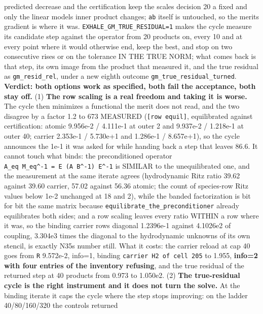 \documentclass[english,a4paper]{my_memo}
\begin{document}
\begin{itemize}
  predicted decrease and the certification keep the scales decision 20 a
  fixed and only the linear model\textquotesingle s inner product changes; \texttt{ab} itself is
  untouched, so the merit\textquotesingle s gradient is where it was.
  \texttt{EXHALE\_GM\_TRUE\_RESIDUAL=1} makes the cycle measure its candidate step
  against the operator from 20 products on, every 10 and at every point
  where it would otherwise end, keep the best, and stop on two consecutive
  rises or on the tolerance IN THE TRUE NORM; what comes back is that
  step, its own image from the product that measured it, and the true
  residual as \texttt{gm\_resid\_rel}, under a new eighth outcome
  \texttt{gm\_true\_residual\_turned}. \textbf{Verdict: both options work as specified, both
  fail the acceptance, both stay off.} (1) \textbf{The row scaling is a real
  freedom and taking it is worse.} The cycle then minimizes a functional
  the merit does not read, and the two disagree by a factor 1.2 to 673
  MEASURED (\texttt{{[}row\ equil{]}}, equilibrated against certification: atomic
  9.956e-2 / 4.111e-1 at outer 2 and 9.937e-2 / 1.218e-1 at outer 40;
  carrier 2.353e-1 / 5.730e+1 and 1.286e-1 / 8.657e+1), so the cycle
  announces the 1e-1 it was asked for while handing back a step that
  leaves 86.6. It cannot touch what binds: the preconditioned operator
  \texttt{A\_eq\ M\_eq\^{}-1\ =\ E\ (A\ B\^{}-1)\ E\^{}-1} is SIMILAR to the unequilibrated one,
  and the measurement at the same iterate agrees (hydrodynamic Ritz ratio
  39.62 against 39.60 carrier, 57.02 against 56.36 atomic; the count of
  species-row Ritz values below 1e-2 unchanged at 18 and 2), while the
  banded factorization is bit for bit the same matrix because
  \texttt{equilibrate\_the\_preconditioner} already equilibrates both sides; and a
  row scaling leaves every ratio WITHIN a row where it was, so the binding
  carrier row\textquotesingle s diagonal 1.2396e-1 against 4.1026e2 of coupling, 3.304e3
  times the diagonal to the hydrodynamic unknowns of its own stencil, is
  exactly N35\textquotesingle s number still. What it costs: the carrier reload at cap 40
  goes from \texttt{\textbar{}\textbar{}R\textbar{}\textbar{}} 9.572e-2, info=1, binding \texttt{carrier\ H2\ of\ cell\ 205} to
  1.955, \textbf{info=2 with four entries of the inventory refusing}, and the
  true residual of the returned step at 40 products from 0.973 to 1.050e2.
  (2) \textbf{The true-residual cycle is the right instrument and it does not
  turn the solve.} At the binding iterate it caps the cycle where the
  step stops improving: on the ladder 40/80/160/320 the control\textquotesingle s returned

\end{itemize}
\end{document}
